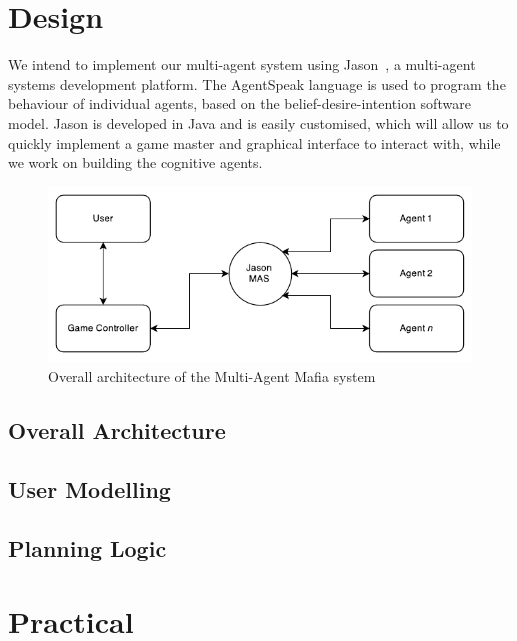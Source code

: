 \documentclass[12pt]{article} %
\begin{document}
\section{Design}

We intend to implement our multi-agent system using Jason~\cite{JAS2015}, a multi-agent systems development platform. The AgentSpeak language is used to program the behaviour of individual agents, based on the belief-desire-intention software model. Jason is developed in Java and is easily customised, which will allow us to quickly implement a game master and graphical interface to interact with, while we work on building the cognitive agents.

\begin{figure}
	\centering
	\includegraphics[width=\linewidth]{Overall.pdf}
	\caption{Overall architecture of the Multi-Agent Mafia system}
\end{figure}

\subsection{Overall Architecture}

\subsection{User Modelling}

\subsection{Planning Logic}


\section{Practical}
\end{document}
